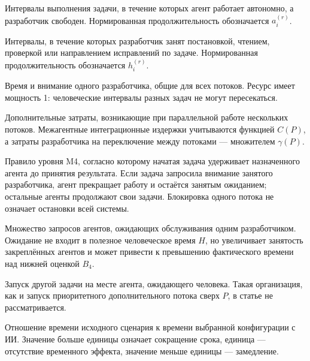 \begin{description}[style=nextline]
  \item[Агентная составляющая] Интервалы выполнения задачи, в течение которых
  агент работает автономно, а разработчик свободен. Нормированная
  продолжительность обозначается $a_i^{(r)}$.

  \item[Человеческая составляющая] Интервалы, в течение
  которых разработчик занят постановкой, чтением, проверкой или направлением
  исправлений по задаче. Нормированная продолжительность обозначается
  $h_i^{(r)}$.

  \item[Человеческий ресурс] Время и внимание одного разработчика, общие для
  всех потоков. Ресурс имеет мощность 1: человеческие интервалы разных задач
  не могут пересекаться.

  \item[Координационные издержки] Дополнительные затраты, возникающие при
  параллельной работе нескольких потоков. Межагентные интеграционные издержки
  учитываются функцией $C(P)$, а затраты разработчика на переключение между
  потоками --- множителем $\gamma(P)$.

  \item[Локальная блокировка агентного потока] Правило уровня M4, согласно
  которому начатая задача удерживает назначенного агента до принятия результата.
  Если задача запросила внимание занятого разработчика, агент прекращает работу
  и остаётся занятым ожиданием; остальные агенты продолжают свои задачи.
  Блокировка одного потока не означает остановки всей системы.

  \item[Очередь к человеческому ресурсу] Множество запросов агентов, ожидающих
  обслуживания одним разработчиком. Ожидание не входит в полезное человеческое
  время $H$, но увеличивает занятость закреплённых агентов и может привести к
  превышению фактического времени над нижней оценкой $B_4$.

  \item[Переиспользование заблокированного потока] Запуск другой задачи на месте
  агента, ожидающего человека. Такая организация, как и запуск приоритетного
  дополнительного потока сверх $P$, в статье не рассматривается.

  \item[Ускорение] Отношение времени исходного сценария к времени выбранной
  конфигурации с ИИ. Значение больше единицы означает сокращение срока, единица
  --- отсутствие временного эффекта, значение меньше единицы --- замедление.


\end{description}
